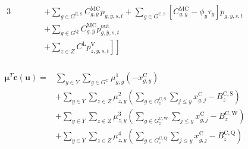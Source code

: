 \documentclass{article}
\newcommand{\sGeneratorsExistingSolar}{G^{\mathrm{E,S}}}
\newcommand{\sGeneratorsCandidate}{G^{\mathrm{C}}}
\newcommand{\sGeneratorsCandidateWind}{G^{\mathrm{C,W}}}
\newcommand{\sGeneratorsCandidateSolar}{G^{\mathrm{C,S}}}
\newcommand{\sStorage}{G^{\mathrm{Q}}}
\newcommand{\sStorageCandidate}{G^{\mathrm{C,Q}}}
\newcommand{\sYears}{Y}
\newcommand{\sZones}{Z}
\newcommand{\iGenerator}{g}
\newcommand{\iYear}{y}
\newcommand{\iYearTerminal}{\overline{\iYear}}
\newcommand{\iYearAlias}{j}
\newcommand{\iScenario}{s}
\newcommand{\iInterval}{t}
\newcommand{\iZone}{z}
\newcommand{\cMarginalCost}[1][\iGenerator,\iYear]{C^{\mathrm{MC}}_{#1}}
\newcommand{\cBuildLimitWind}{B^{\mathrm{C,\mathrm{W}}}_{\iZone}}
\newcommand{\cBuildLimitSolar}{B^{\mathrm{C,\mathrm{S}}}_{\iZone}}
\newcommand{\cBuildLimitStorage}{B^{\mathrm{C,\mathrm{Q}}}_{\iZone}}
\newcommand{\cLostLoadCost}{C^{\mathrm{L}}}
\newcommand{\vBaseline}[1][\iYear]{\phi_{#1}}
\newcommand{\vPermitPrice}[1][\iYear]{\tau_{#1}}
\newcommand{\vInstalledCapacity}[1][\iGenerator,\iYear]{x^{\mathrm{C}}_{#1}}
\newcommand{\vPower}[1][\iGenerator,\iYear,\iScenario,\iInterval]{p_{#1}}
\newcommand{\vPowerOut}[1][\iGenerator,\iYear,\iScenario,\iInterval]{p^{\mathrm{out}}_{#1}}
\newcommand{\vLostLoadPower}[1][\iZone,\iYear,\iScenario,\iInterval]{p^{\mathrm{V}}_{#1}}
\newcommand{\vInstalledCapacityTotal}[1][\iGenerator,\iYear]{a_{#1}}
\newcommand{\dNonNegativeCandidateCapacity}[1][\iGenerator,\iYear]{\mu_{#1}^{1}}
\newcommand{\dSolarBuildLimit}[1][\iZone,\iYear]{\mu_{#1}^{2}}
\newcommand{\dWindBuildLimit}[1][\iZone,\iYear]{\mu_{#1}^{3}}
\newcommand{\dStorageBuildLimit}[1][\iZone,\iYear]{\mu_{#1}^{4}}
\newcommand{\dTotalInstallCapacity}[1][\iGenerator,\iYear]{\nu_{#1}^{1}}
\begin{document}
\begin{alignat}{3}
	& && && + \sum\limits_{\iGenerator \in \sGeneratorsExistingSolar} \cMarginalCost[\iGenerator,\iYearTerminal] \vPower[\iGenerator,\iYearTerminal,\iScenario,\iInterval] + \sum\limits_{\iGenerator \in \sGeneratorsCandidateSolar} \left[\cMarginalCost[\iGenerator,\iYearTerminal] - \vBaseline[\iYearTerminal]\vPermitPrice[\iYearTerminal]\right] \vPower[\iGenerator,\iYearTerminal,\iScenario,\iInterval]\nonumber\\
	& && && + \sum\limits_{\iGenerator \in \sStorage} \cMarginalCost[\iGenerator,\iYearTerminal] \vPowerOut[\iGenerator,\iYearTerminal,\iScenario,\iInterval] \nonumber\\
	& && && \left.\left. + \sum\limits_{\iZone \in \sZones} \cLostLoadCost \vLostLoadPower[\iZone,\iYearTerminal,\iScenario,\iInterval] \right]\right] \nonumber\\
\end{alignat}

\begin{align}
\begin{split}
\bm{\mu}^{T}\bm{c}(\bm{u}) = & \sum\limits_{\iYear \in \sYears} \sum\limits_{\iGenerator \in \sGeneratorsCandidate} \dNonNegativeCandidateCapacity \left(-\vInstalledCapacity\right)\\
& + \sum\limits_{\iYear \in \sYears}\sum\limits_{\iZone \in \sZones} \dSolarBuildLimit \left(\sum\limits_{\iGenerator \in \sGeneratorsCandidateSolar_{\iZone}} \sum\limits_{\iYearAlias \leq \iYear} \vInstalledCapacity[\iGenerator,\iYearAlias]  - \cBuildLimitSolar\right)\\
& + \sum\limits_{\iYear \in \sYears}\sum\limits_{\iZone \in \sZones} \dWindBuildLimit \left(\sum\limits_{\iGenerator \in \sGeneratorsCandidateWind_{\iZone}} \sum\limits_{\iYearAlias \leq \iYear} \vInstalledCapacity[\iGenerator,\iYearAlias] - \cBuildLimitWind\right)\\
& + \sum\limits_{\iYear \in \sYears}\sum\limits_{\iZone \in \sZones} \dStorageBuildLimit \left(\sum\limits_{\iGenerator \in \sStorageCandidate_{\iZone}} \sum\limits_{\iYearAlias \leq \iYear} \vInstalledCapacity[\iGenerator,\iYearAlias] - \cBuildLimitStorage\right)\\
\end{split}
\end{align}

\end{document}
